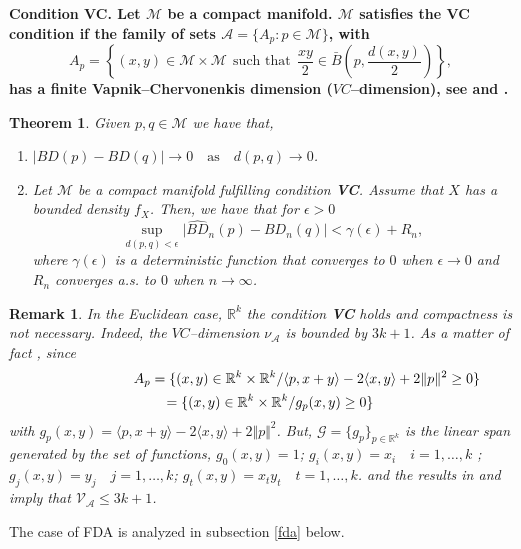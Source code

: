 \documentclass[a4paper]{article}
\numberwithin{equation}{section}
\newtheorem{theorem}{Theorem}[section]
\newtheorem{remark}{Remark}
\newcommand{\M}{\mbox{$\mathcal{M}$}}
\begin{document}
\begin{enumerate}
\bf Condition VC. \rm Let $\mathcal M$ be a compact manifold. $\mathcal M$ satisfies the  \textbf{VC} condition if the family of sets $\mathcal{A}=\{ A_p: p \in \M \}$, with 
 $$A_p= \left \{(x,y) \in \M \times \M \ \ \mbox{such that} \ \  \frac{xy}{2} \in \bar{B}\left(p, \frac{d(x,y)}{2}\right) \right \},$$ has a finite  Vapnik--Chervonenkis dimension ($VC$--dimension),  see \cite{steele1975} and  \cite{dudley1978}.
\begin{theorem}
\label{teoremacontinuidadmanifold}
Given $p,q \in \M$ we have that,
\begin{enumerate}
\item [(a)] $\vert BD(p) -  BD(q) \vert \rightarrow 0  \quad \textrm{as} \quad d(p,q) \rightarrow 0$. 
\item [(b)] Let $\M$ be a compact manifold fulfilling condition \textbf{VC}. Assume that $X$ has a bounded density $f_X$. Then, we have that for $\epsilon>0$
\begin{displaymath}
 \sup_{d(p,q)<\epsilon} \vert \widehat{BD}_n(p) - \widehat{BD}_n(q)  \vert  < \gamma(\epsilon)  + R_n,
\end{displaymath}
 where $\gamma(\epsilon)$ is a deterministic function that converges to $0$ when $\epsilon \rightarrow 0$ and $R_n$ converges a.s. to $0$ when  $n \rightarrow \infty$.
\end{enumerate}
\end{theorem}
\begin{remark}
\label{vc2}
 In the Euclidean case,  $\mathbb{R}^k$ the condition {\bf {VC} } holds and compactness is not necessary. Indeed, the $VC$--dimension $\nu_{\mathcal A}$ is bounded by $3k+1$. As a matter of fact
, since
\begin{align*}
A_p= \{(x,y) \in \mathbb{R}^k \times \mathbb{R}^k /  \langle p,x+y \rangle - 2 \langle x,y\rangle+ 2\Vert p \Vert^2 \geq 0  \} \\
&\hspace{-8 cm}= \{(x,y) \in \mathbb{R}^k \times \mathbb{R}^k / g_p(x,y)  \geq 0  \}
\end{align*}
with $g_p(x,y)=\langle p,x+y \rangle - 2 \langle x,y \rangle+ 2\Vert p \Vert^2$. But,  $\mathcal{G}=\{g_p\}_{p \in \mathbb{R}^k}$ is the linear span generated by the set of functions, $g_0(x,y)= 1$;   $g_i(x,y)= x_i  \quad  i=1, \ldots,k$ ;  $g_j(x,y)= y_j  \quad  j=1, \ldots,k$;  $g_t(x,y)= x_t y_t  \quad  t=1, \ldots,k$.
and the results in \cite{steele1975} and  \cite{dudley1978} imply that  $\mathcal{V}_\mathcal{A}  \leq 3k+1$. 
\end{remark}
The case of FDA is analyzed in subsection \ref{fda} below. 


\end{enumerate}
\end{document}
